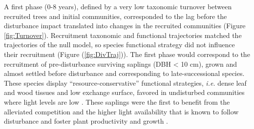 \documentclass[fleqn,10pt]{ArtEcoFoG} %
\begin{document}
A first phase (0-8 years), defined by a very low taxonomic turnover
between recruited trees and initial communities, corresponded to the lag
before the disturbance impact translated into changes in the recruited
communities (Figure \ref{fig:Turnover}). Recruitment taxonomic and
functional trajectories matched the trajectories of the null model, so
species functional strategy did not influence their recruitment (Figure
(\ref{fig:DivTraj})). The first phase would correspond to the
recruitment of pre-disturbance surviving saplings (DBH \textless{} 10
cm), grown and almost settled before disturbance and corresponding to
late-successional species. These species display
``resource-conservative'' functional strategies, \emph{i.e.} dense leaf
and wood tissues and low exchange surface, favored in undisturbed
communities where light levels are low \citep{Peet1992, Denslow2000}.
These saplings were the first to benefit from the alleviated competition
and the higher light availability that is known to follow disturbance
and foster plant productivity and growth
\citep{Monteith1972, Chazdon1984}.
\end{document}
